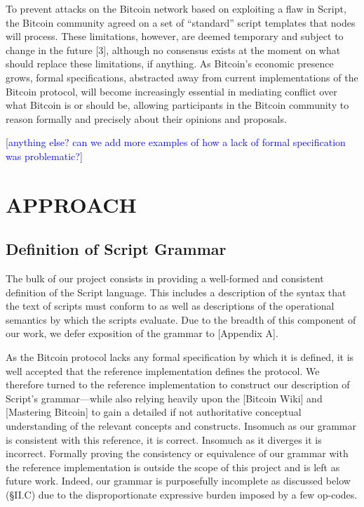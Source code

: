 \documentclass[letterpaper, 10 pt, conference]{ieeeconf}
\begin{document}
To prevent attacks on the Bitcoin network based on exploiting a flaw in Script, the Bitcoin community agreed on a set of ``standard'' script templates that nodes will process. These limitations, however, are deemed temporary and subject to change in the future [3], although no consensus exists at the moment on what should replace these limitations, if anything. As Bitcoin's economic presence grows, formal specifications, abstracted away from current implementations of the Bitcoin protocol, will become increasingly essential in mediating conflict over what Bitcoin is or should be, allowing participants in the Bitcoin community to reason formally and precisely about their opinions and proposals.

\textcolor{blue}{[anything else? can we add more examples of how a lack of formal specification was problematic?]}


\section{APPROACH}

\subsection{Definition of Script Grammar}
The bulk of our project consists in providing a well-formed and consistent definition of the Script language. This includes a description of the syntax that the text of scripts must conform to as well as descriptions of the operational semantics by which the scripts evaluate. Due to the breadth of this component of our work, we defer exposition of the grammar to [Appendix A].

As the Bitcoin protocol lacks any formal specification by which it is defined, it is well accepted that the reference implementation defines the protocol. We therefore turned to the reference implementation to construct our description of Script's grammar---while also relying heavily upon the [Bitcoin Wiki] and [Mastering Bitcoin] to gain a detailed if not authoritative conceptual understanding of the relevant concepts and constructs. Insomuch as our grammar is consistent with this reference, it is correct. Insomuch as it diverges it is incorrect. Formally proving the consistency or equivalence of our grammar with the reference implementation is outside the scope of this project and is left as future work. Indeed, our grammar is purposefully incomplete as discussed below (\S II.C) due to the disproportionate expressive burden imposed by a few op-codes.
\end{document}

